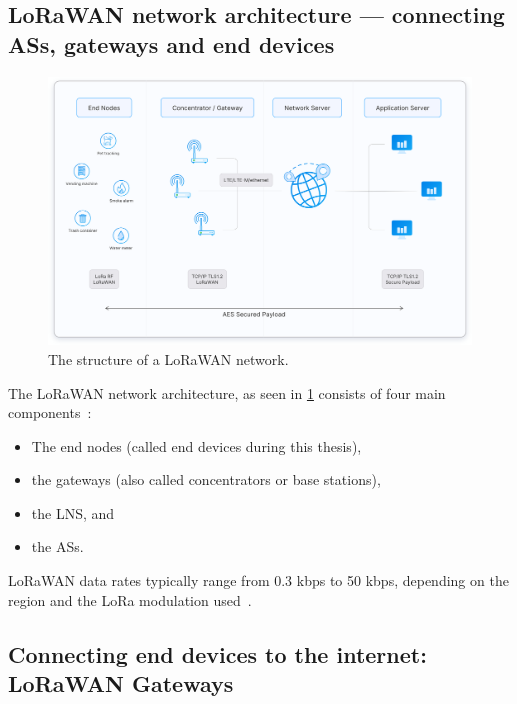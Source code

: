 \subsection{\acs{LoRaWAN} network architecture — connecting \aclp{AS}, gateways and end devices}

\begin{figure}[htbp]
    \centering
    \includegraphics[width=1\textwidth]{pictures/lorawan-structure/lorawan-architecture.png}
    \caption{
        The structure of a \ac{LoRaWAN} network.~\protect\cite{the_things_industries_bv_lorawan_nodate}
    }\label{pic:lorawan-network-structure}
\end{figure}

The \ac{LoRaWAN} network architecture, as seen in \cref{pic:lorawan-network-structure} consists of four main components~\cite[p. 8]{lora_alliance_inc_lorawan_specification_2017}:

\begin{itemize}
    \item The end nodes (called end devices during this thesis),
    \item the gateways (also called concentrators or base stations),
    \item the \acf{LNS}, and
    \item the \acfp{AS}.
\end{itemize}

\ac{LoRaWAN} data rates typically range from 0.3 kbps to 50 kbps, depending on the region and the \ac{LoRa} modulation used~\cite[p. 8]{lora_alliance_inc_lorawan_specification_2017}.

\subsection{Connecting end devices to the internet: \acs{LoRaWAN} Gateways}\label{sec:gateways}

